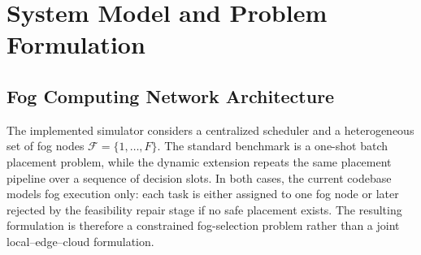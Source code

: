 \documentclass[pdflatex,sn-mathphys-num]{sn-jnl}
\begin{document}


\section{System Model and Problem Formulation}

\subsection{Fog Computing Network Architecture}
The implemented simulator considers a centralized scheduler and a heterogeneous set of fog nodes $\mathcal{F}=\{1,\dots,F\}$. The standard benchmark is a one-shot batch placement problem, while the dynamic extension repeats the same placement pipeline over a sequence of decision slots. In both cases, the current codebase models fog execution only: each task is either assigned to one fog node or later rejected by the feasibility repair stage if no safe placement exists. The resulting formulation is therefore a constrained fog-selection problem rather than a joint local--edge--cloud formulation.
\end{document}
